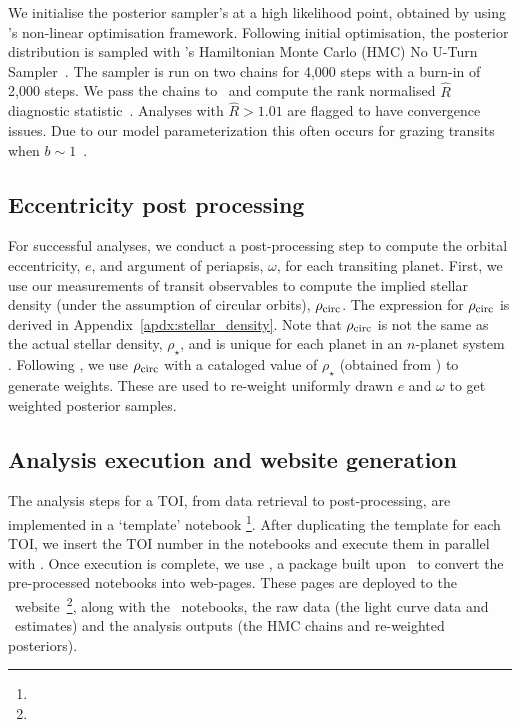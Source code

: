 \documentclass[floatfix,ApJL,twocolumn]{aastex631}
\begin{document}


We initialise the posterior sampler's at a high likelihood point, obtained by using \exoplanet's non-linear optimisation framework.
Following initial optimisation, the posterior distribution is sampled with \pymc's Hamiltonian Monte Carlo (HMC) No U-Turn Sampler~\citep{Betancourt:2017:arXiv, Hoffman:2011:arXiv,Salvatier:2016:ascl}.
The sampler is run on two chains for 4,000 steps with a burn-in of 2,000 steps.
We pass the chains to \arviz\ and compute the rank normalised $\hat{R}$ diagnostic statistic~\cite{Vehtari:2019:arXiv}.
Analyses with $\hat{R}>1.01$ are flagged to have convergence issues. 
Due to our model parameterization this often occurs for grazing transits when $b\sim1$~\cite{Gilbert:2022:AJ}.


\subsection{Eccentricity post processing}

For successful analyses, we conduct a post-processing step to compute the orbital eccentricity, $e$, and argument of periapsis, $\omega$, for each transiting planet. 
First, we use our measurements of transit observables to compute the implied stellar density (under the assumption of circular orbits), $\rho_{\rm circ}$. 
The expression for $\rho_{\rm circ}$ is derived in Appendix~\ref{apdx:stellar_density}.
Note that $\rho_{\rm circ}$ is not the same as the actual stellar density, $\rho_{\star}$, and is unique for each planet in an $n$-planet system \citep[see, for example,][]{Dawson:2012:ApJ, Kipping:2012:MNRAS}.
Following \citet{Dawson:2012:ApJ}, we use $\rho_{\rm circ}$ with a cataloged value of $\rho_\star$ (obtained from \mast) to generate weights. 
These are used to re-weight uniformly drawn $e$ and $\omega$ to get weighted posterior samples. 

\subsection{Analysis execution and website generation}

The analysis steps for a TOI, from data retrieval to post-processing, are implemented in a `template' \jupyter notebook \footnote{\toiTemplateLink}.
After duplicating the template for each TOI, we insert the TOI number in the notebooks and execute them in parallel with \nbconvert. 
Once execution is complete, we use \jupyterbook, a package built upon \sphinx\ to convert the pre-processed notebooks into web-pages.
These pages are deployed to the \tessAtlas\ website~\footnote{\atlasUrl},  along with the \jupyter\ notebooks, the raw data (the light curve data and \exofop\ estimates) and the analysis outputs (the HMC chains and re-weighted posteriors). 
\end{document}
